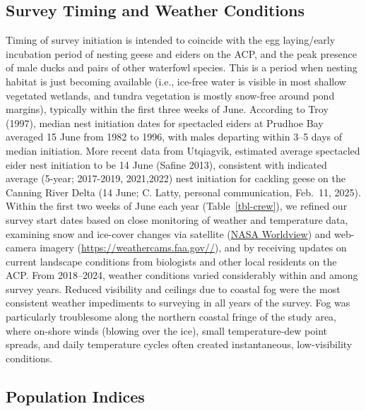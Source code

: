 \documentclass[
]{article}
\begin{document}
\endgroup{}

\subsection*{Survey Timing and Weather
Conditions}\label{survey-timing-and-weather-conditions}

Timing of survey initiation is intended to coincide with the egg
laying/early incubation period of nesting geese and eiders on the ACP,
and the peak presence of male ducks and pairs of other waterfowl
species. This is a period when nesting habitat is just becoming
available (i.e., ice-free water is visible in most shallow vegetated
wetlands, and tundra vegetation is mostly snow-free around pond
margins), typically within the first three weeks of June. According to
Troy (1997), median nest initiation dates for spectacled eiders at
Prudhoe Bay averaged 15 June from 1982 to 1996, with males departing
within 3--5 days of median initiation. More recent data from Utqiagvik,
estimated average spectacled eider nest initiation to be 14 June (Safine
2013), consistent with indicated average (5-year; 2017-2019, 2021,2022)
nest initiation for cackling geese on the Canning River Delta (14 June;
C. Latty, personal communication, Feb.~11, 2025). Within the first two
weeks of June each year (Table~\ref{tbl-crew}), we refined our survey
start dates based on close monitoring of weather and temperature data,
examining snow and ice-cover changes via satellite
(\href{https://worldview.earthdata.nasa.gov/}{NASA Worldview}) and
web-camera imagery (\url{https://weathercams.faa.gov//}), and by
receiving updates on current landscape conditions from biologists and
other local residents on the ACP. From 2018--2024, weather conditions
varied considerably within and among survey years. Reduced visibility
and ceilings due to coastal fog were the most consistent weather
impediments to surveying in all years of the survey. Fog was
particularly troublesome along the northern coastal fringe of the study
area, where on-shore winds (blowing over the ice), small temperature-dew
point spreads, and daily temperature cycles often created instantaneous,
low-visibility conditions.

\subsection*{Population Indices}\label{population-indices}
\end{document}
